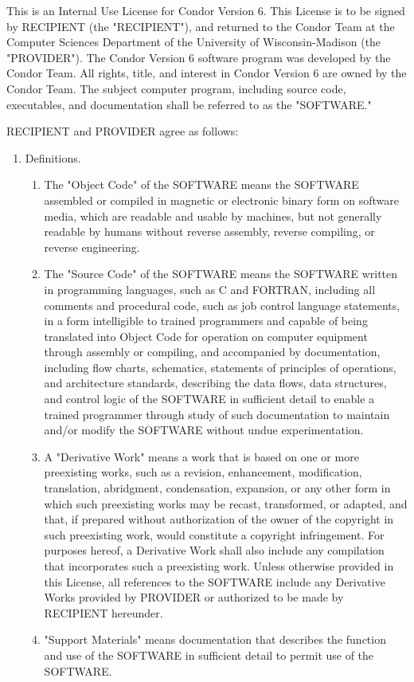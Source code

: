 This is an Internal Use License for Condor Version 6.  This License is
to be signed by RECIPIENT (the "RECIPIENT"), and returned to the
Condor Team at the Computer Sciences Department of the University of
Wisconsin-Madison (the "PROVIDER").  The Condor Version 6 software
program was developed by the Condor Team.  All rights, title, and
interest in Condor Version 6 are owned by the Condor Team.  The
subject computer program, including source code, executables, and
documentation shall be referred to as the "SOFTWARE."

RECIPIENT and PROVIDER agree as follows:

\begin{enumerate}
\item Definitions.
  \begin{enumerate} 
  \item The "Object Code" of the SOFTWARE means the SOFTWARE assembled
  or compiled in magnetic or electronic binary form on software media,
  which are readable and usable by machines, but not generally
  readable by humans without reverse assembly, reverse compiling, or
  reverse engineering.
  \item The "Source Code" of the SOFTWARE means the SOFTWARE written
  in programming languages, such as C and FORTRAN, including all
  comments and procedural code, such as job control language
  statements, in a form intelligible to trained programmers and
  capable of being translated into Object Code for operation on
  computer equipment through assembly or compiling, and accompanied by
  documentation, including flow charts, schematics, statements of
  principles of operations, and architecture standards, describing the
  data flows, data structures, and control logic of the SOFTWARE in
  sufficient detail to enable a trained programmer through study of
  such documentation to maintain and/or modify the SOFTWARE without
  undue experimentation.
  \item A "Derivative Work" means a work that is based on one or more
  preexisting works, such as a revision, enhancement, modification,
  translation, abridgment, condensation, expansion, or any other form
  in which such preexisting works may be recast, transformed, or
  adapted, and that, if prepared without authorization of the owner of
  the copyright in such preexisting work, would constitute a copyright
  infringement.  For purposes hereof, a Derivative Work shall also
  include any compilation that incorporates such a preexisting work.
  Unless otherwise provided in this License, all references to the
  SOFTWARE include any Derivative Works provided by PROVIDER or
  authorized to be made by RECIPIENT hereunder.
  \item "Support Materials" means documentation that describes the
  function and use of the SOFTWARE in sufficient detail to permit use
  of the SOFTWARE.  
  \end{enumerate}


\end{enumerate}
